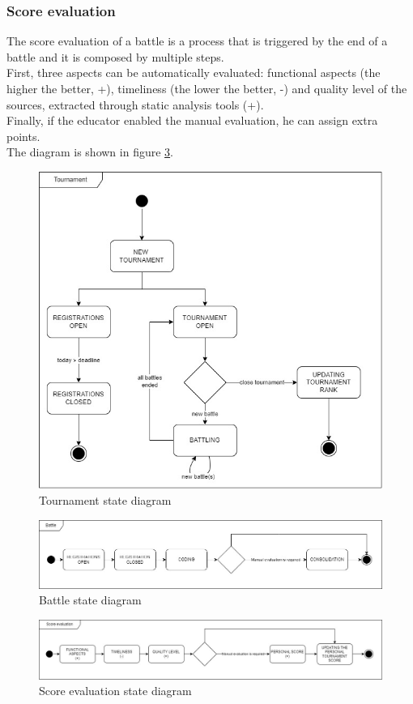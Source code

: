 \subsubsection*{Score evaluation}
The score evaluation of a battle is a process that is triggered by the end of a battle and it is composed by multiple steps.\\
First, three aspects can be automatically evaluated: functional aspects (the higher the better, +), timeliness (the lower the better, -) and quality level of the sources, extracted through static analysis tools (+). \\
Finally, if the educator enabled the manual evaluation, he can assign extra points. \\
The diagram is shown in figure \ref{fig:score-evaluation-state-diagram}.

\begin{figure}[H]
    \centering
    \includegraphics[width=.8\textwidth]{state_diagrams/tournament.jpg}
    \caption{Tournament state diagram}
    \label{fig:tournament-state-diagram}
\end{figure}
\begin{figure}[H]
    \centering
    \includegraphics[width=1\textwidth]{state_diagrams/battle.jpg}
    \caption{Battle state diagram}
    \label{fig:battle-state-diagram}
\end{figure}
\begin{figure}[H]
    \centering
    \includegraphics[width=1\textwidth]{state_diagrams/score_evaluation.jpg}
    \caption{Score evaluation state diagram}
    \label{fig:score-evaluation-state-diagram}
\end{figure}

